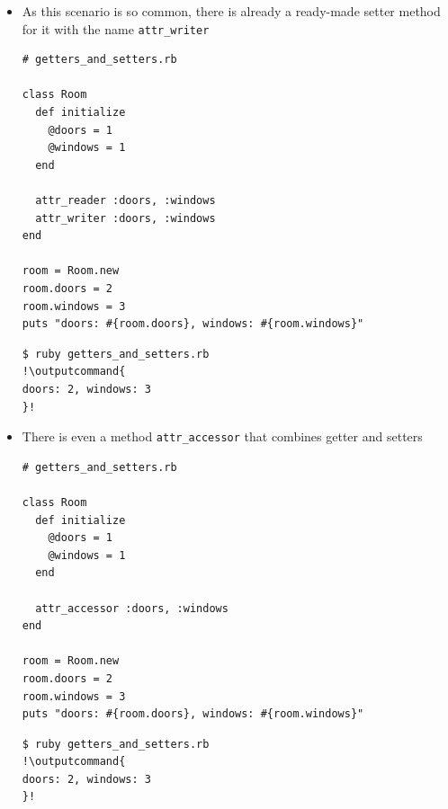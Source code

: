 \documentclass{beamer}
\newcommand{\outputcommand}[1]{\color{darkgreen}{#1}}
\begin{document}
\begin{frame}
\begin{itemize}
\begin{lstlisting}[escapechar=&]
  attr_reader :doors, :windows

  def doors= value
    @doors = value
  end

  def windows= value
    @windows = value
  end
end

room = Room.new
room.doors = 2
room.windows = 3
puts "doors: #{room.doors}, windows: #{room.windows}"
\end{lstlisting}

\lstset{language=shell}
\begin{lstlisting}[numbers=none, escapechar=!]
$ ruby getters_and_setters.rb
!\outputcommand{
doors: 2, windows: 3
}!
\end{lstlisting}

\item As this scenario is so common, there is already a ready-made setter method for it with the name \texttt{attr\_writer}
\lstset{language=Ruby, style=eclipse}
\begin{lstlisting}[escapechar=&]
# getters_and_setters.rb

class Room
  def initialize
    @doors = 1
    @windows = 1
  end

  attr_reader :doors, :windows
  attr_writer :doors, :windows
end

room = Room.new
room.doors = 2
room.windows = 3
puts "doors: #{room.doors}, windows: #{room.windows}"
\end{lstlisting}

\lstset{language=shell}
\begin{lstlisting}[numbers=none, escapechar=!]
$ ruby getters_and_setters.rb
!\outputcommand{
doors: 2, windows: 3
}!
\end{lstlisting}
\item There is even a method \texttt{attr\_accessor} that combines getter and setters
\lstset{language=Ruby, style=eclipse}
\begin{lstlisting}[escapechar=&]
# getters_and_setters.rb

class Room
  def initialize
    @doors = 1
    @windows = 1
  end

  attr_accessor :doors, :windows
end

room = Room.new
room.doors = 2
room.windows = 3
puts "doors: #{room.doors}, windows: #{room.windows}"
\end{lstlisting}

\lstset{language=shell}
\begin{lstlisting}[numbers=none, escapechar=!]
$ ruby getters_and_setters.rb
!\outputcommand{
doors: 2, windows: 3
}!
\end{lstlisting}


\end{itemize}

\end{frame}
\end{document}
